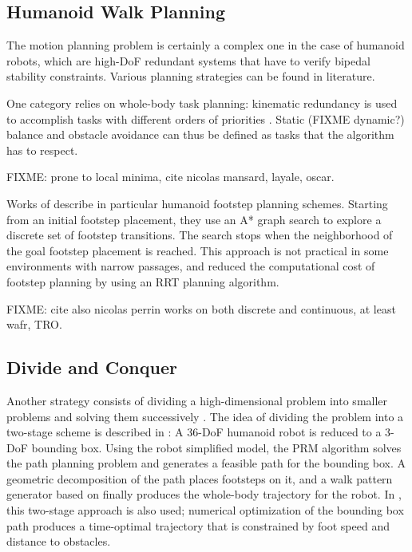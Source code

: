 \subsection{Humanoid Walk Planning}
\label{subsec:chap1-humanoid-walk-planning}

The motion planning problem is certainly a complex one in the case of
humanoid robots, which are high-DoF redundant systems that have to
verify bipedal stability constraints. Various planning strategies can
be found in literature.

One category relies on whole-body task planning: kinematic redundancy
is used to accomplish tasks with different orders of priorities
\cite{khat04,kano09}. Static (FIXME dynamic?) balance and obstacle
avoidance can thus be defined as tasks that the algorithm has to
respect.

FIXME: prone to local minima, cite nicolas mansard, layale,
oscar.

Works of \cite{kuff01,ches05} describe in particular humanoid footstep
planning schemes. Starting from an initial footstep placement, they
use an A* graph search \cite{hart68} to explore a discrete set of
footstep transitions. The search stops when the neighborhood of the
goal footstep placement is reached. This approach is not practical in
some environments with narrow passages, and \cite{xia09} reduced the
computational cost of footstep planning by using an RRT planning
algorithm.

FIXME: cite also nicolas perrin works on both discrete and
continuous, at least wafr, TRO.

\subsection{Divide and Conquer}
\label{subsec:chap1-bounding-box}

Another strategy consists of dividing a high-dimensional problem into
smaller problems and solving them successively \cite{zhan09}. The idea
of dividing the problem into a two-stage scheme is described in
\cite{yosh08}: A 36-DoF humanoid robot is reduced to a 3-DoF bounding
box. Using the robot simplified model, the PRM algorithm solves the
path planning problem and generates a feasible path for the bounding
box. A geometric decomposition of the path places footsteps on it, and
a walk pattern generator based on \cite{kaji03} finally produces the
whole-body trajectory for the robot. In \cite{moul10}, this two-stage
approach is also used; numerical optimization of the bounding box path
produces a time-optimal trajectory that is constrained by foot speed
and distance to obstacles.

